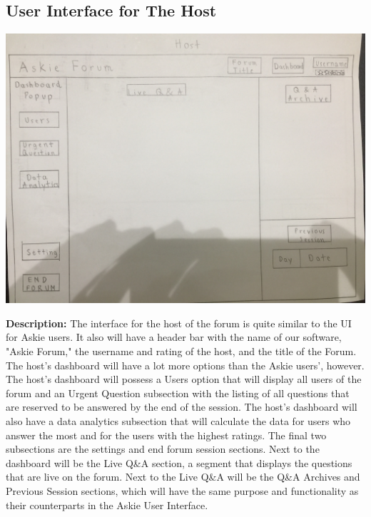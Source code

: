 \documentclass[12pt]{article}
\begin{document}
\subsection{User Interface for The Host}
\begin{flushleft}
    \includegraphics[width=\textwidth]{Assignment_3_UIP2}
\end{flushleft}
\begin{flushleft}
\textbf{Description:} The interface for the host of the forum is quite similar to the UI for Askie users. It also will have a header bar with the name of our software, "Askie Forum," the username and rating of the host, and the title of the Forum. The host's dashboard will have a lot more options than the Askie users', however. The host's dashboard will possess a Users option that will display all users of the forum and an Urgent Question subsection with the listing of all questions that are reserved to be answered by the end of the session. The host's dashboard will also have a data analytics subsection that will calculate the data for users who answer the most and for the users with the highest ratings. The final two subsections are the settings and end forum session sections. Next to the dashboard will be the Live Q\&A section, a segment that displays the questions that are live on the forum. Next to the Live Q\&A will be the Q\&A Archives and Previous Session sections, which will have the same purpose and functionality as their counterparts in the Askie User Interface. 
\end{flushleft}
\end{document}
